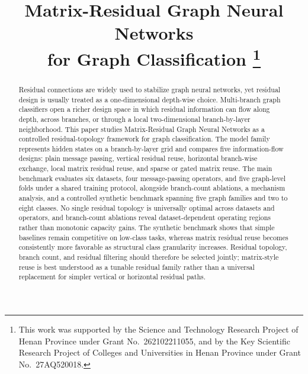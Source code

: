 \documentclass[conference]{IEEEtran}
\begin{document}
\title{Matrix-Residual Graph Neural Networks\\ for Graph Classification
\thanks{This work was supported by the Science and Technology Research Project
of Henan Province under Grant No.~262102211055, and by the Key Scientific
Research Project of Colleges and Universities in Henan Province under Grant
No.~27AQ520018.}}

\author{
}

\maketitle

\begin{abstract}
Residual connections are widely used to stabilize graph neural networks, yet
residual design is usually treated as a one-dimensional depth-wise choice.
Multi-branch graph classifiers open a richer design space in which residual
information can flow along depth, across branches, or through a local
two-dimensional branch-by-layer neighborhood. This paper studies
Matrix-Residual Graph Neural Networks as a controlled residual-topology
framework for graph classification. The model family represents hidden states
on a branch-by-layer grid and compares five information-flow designs: plain
message passing, vertical residual reuse, horizontal branch-wise exchange,
local matrix residual reuse, and sparse or gated matrix reuse. The main
benchmark evaluates six datasets, four message-passing operators, and five
graph-level folds under a shared training protocol, alongside branch-count
ablations, a mechanism analysis, and a controlled synthetic benchmark spanning
five graph families and two to eight classes. No single residual topology is
universally optimal across datasets and operators, and branch-count ablations
reveal dataset-dependent operating regions rather than monotonic capacity
gains. The synthetic benchmark shows that simple baselines remain competitive
on low-class tasks, whereas matrix residual reuse becomes consistently more
favorable as structural class granularity increases. Residual topology, branch
count, and residual filtering should therefore be selected jointly;
matrix-style reuse is best understood as a tunable residual family rather than
a universal replacement for simpler vertical or horizontal residual paths.
\end{abstract}
\end{document}
